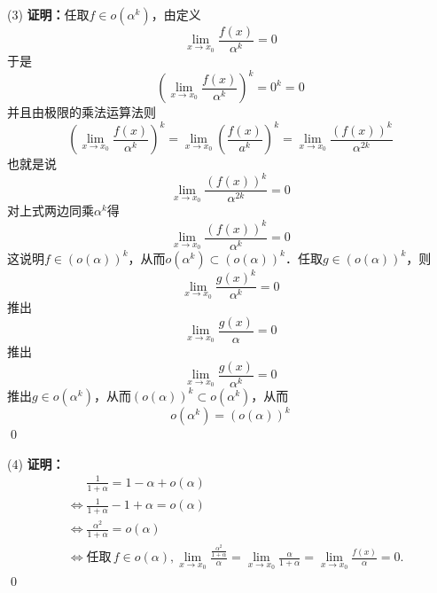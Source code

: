 (3) \textbf{证明：}任取$f \in o(\alpha^k)$，由定义
\begin{equation}
    \lim_{x \to x_0} \frac{f(x)}{\alpha^k} = 0
\end{equation}
于是
\begin{equation}
    \left( \lim_{x \to x_0} \frac{f(x)}{\alpha^k} \right)^k = 0^k = 0
\end{equation}
并且由极限的乘法运算法则
\begin{equation}
    \left( \lim_{x \to x_0} \frac{f(x)}{\alpha^k} \right)^k = \lim_{x \to x_0} \left( \displaystyle\frac{f(x)}{a^k}  \right)^k = \lim_{x \to x_0} \frac{\left(f(x)\right)^k}{\alpha^{2k}}
\end{equation}
也就是说
\begin{equation}
    \lim_{x \to x_0} \frac{\left(f(x)\right)^{k}}{\alpha^{2k}} = 0
\end{equation}
对上式两边同乘$\alpha^k$得
\begin{equation}
    \lim_{x \to x_0} \frac{\left(f(x)\right)^k}{\alpha^k} = 0
\end{equation}
这说明$f \in \left(o(\alpha)\right)^k$，从而$o(\alpha^k) \subset \left(o(\alpha)\right)^k$．任取$g \in \left(o(\alpha)\right)^k$，则
\begin{equation}
    \lim_{x \to x_0} \frac{g(x)^k}{\alpha^k} = 0
\end{equation}
推出
\begin{equation}
    \lim_{x \to x_0} \frac{g(x)}{\alpha} = 0
\end{equation}
推出
\begin{equation}
    \lim_{x \to x_0} \frac{g(x)}{\alpha^k} = 0
\end{equation}
推出$g \in o(\alpha^k)$，从而$\left(o(\alpha)\right)^k \subset o(\alpha^k)$，从而
\begin{equation}
    o(\alpha^k) = \left(o(\alpha)\right)^k
\end{equation}
\qed

(4) \textbf{证明：}
\begin{align}
    &\mathrel{\phantom{\iff}} \frac{1}{1+\alpha} = 1 - \alpha + o(\alpha) \\
    &\iff \frac{1}{1+\alpha} - 1 + \alpha = o(\alpha) \\
    &\iff \frac{\alpha^2}{1+\alpha} = o(\alpha) \\
    &\iff \text{任取} \, f \in o(\alpha), \lim_{x \to x_0} \frac{\displaystyle\frac{\alpha^2}{1+\alpha}}{\alpha} = \lim_{x \to x_0} \frac{\alpha}{1+\alpha} = \lim_{x \to x_0} \frac{f(x)}{\alpha} = 0.
\end{align}
\qed

